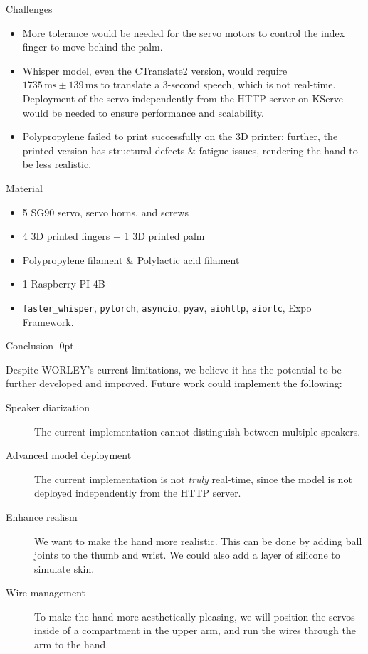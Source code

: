 \documentclass[final, 20pt]{beamer}
\newlength{\colwidth}
\begin{document}
\begin{frame}[t]
\begin{columns}[t]
\begin{column}{\colwidth}
  \begin{block}{Challenges}
    \begin{itemize}
      \item More tolerance would be needed for the servo motors to control the index finger to move behind the palm.
      \item Whisper model, even the CTranslate2 version, would require $1735\,\text{ms}\pm 139\,\text{ms}$ to translate a 3-second speech, which is not real-time. Deployment of the servo independently from the HTTP server on KServe would be needed to ensure performance and scalability.
      \item Polypropylene failed to print successfully on the 3D printer; further, the printed version has structural defects \& fatigue issues, rendering the hand to be less realistic.
    \end{itemize}
  \end{block}

  \begin{block}{Material}
    \begin{itemize}
      \item 5 SG90 servo, servo horns, and screws
      \item 4 3D printed fingers + 1 3D printed palm
      \item Polypropylene filament \& Polylactic acid filament
      \item 1 Raspberry PI 4B
      \item \texttt{faster\_whisper}, \texttt{pytorch}, \texttt{asyncio}, \texttt{pyav}, \texttt{aiohttp}, \texttt{aiortc}, Expo Framework.
    \end{itemize}
  \end{block}
  \begin{block}{Conclusion}
    [0pt]

    Despite WORLEY's current limitations, we believe it has the potential to be further developed and improved. Future work could implement the following:
    
    \begin{description}
      \item[Speaker diarization] The current implementation cannot distinguish between multiple speakers.
      \item[Advanced model deployment] The current implementation is not \emph{truly} real-time, since the model is not deployed independently from the HTTP server.
      \item[Enhance realism] We want to make the hand more realistic. This can be done by adding ball joints to the thumb and wrist. We could also add a layer of silicone to simulate skin.
      \item[Wire management] To make the hand more aesthetically pleasing, we will position the servos inside of a compartment in the upper arm, and run the wires through the arm to the hand.
    \end{description}
    

\end{block}
\end{column}
\end{columns}
\end{frame}
\end{document}
